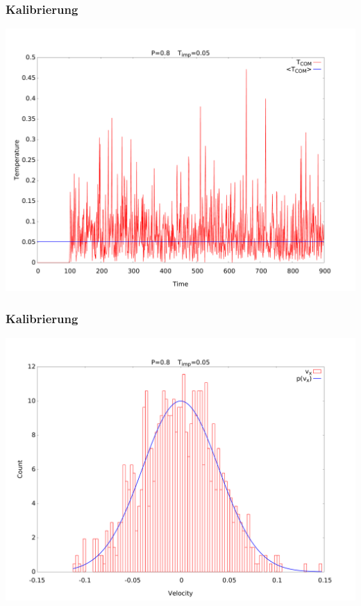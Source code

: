 \documentclass[handout]{beamer}
\begin{document}
\begin{frame}
\frametitle{Kalibrierung}
\begin{center}
\includegraphics[scale=0.2]{../images/vcomsqd.pdf}
\end{center}
\end{frame}

\begin{frame}
\frametitle{Kalibrierung}
\begin{center}
\includegraphics[scale=0.2]{../images/vcomtemp.pdf}
\end{center}
\end{frame}
\end{document}
